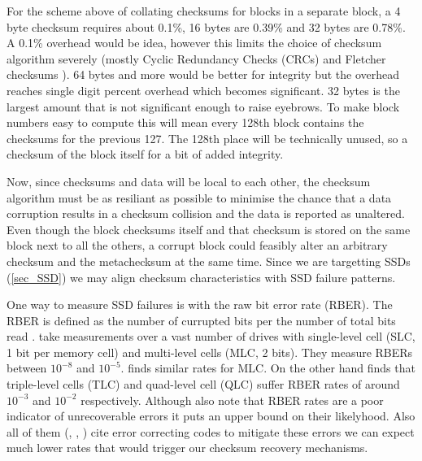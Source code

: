         For the scheme above of collating checksums for blocks in a separate
        block, a 4 byte checksum requires about 0.1\%, 16 bytes are 0.39\% and
        32 bytes are 0.78\%. A 0.1\% overhead would be idea, however this
        limits the choice of checksum algorithm severely (mostly Cyclic
        Redundancy Checks (CRCs) and Fletcher checksums
        \cite{embedded_checksums}). 64 bytes and more would be better for
        integrity but the overhead reaches single digit percent overhead which
        becomes significant. 32 bytes is the largest amount that is not
        significant enough to raise eyebrows. To make block numbers easy to
        compute this will mean every 128th block contains the checksums for the
        previous 127. The 128th place will be technically unused, so a checksum
        of the block itself for a bit of added integrity.

        Now, since checksums and data will be local to each other, the checksum
        algorithm must be as resiliant as possible to minimise the chance that
        a data corruption results in a checksum collision and the data is
        reported as unaltered. Even though the block checksums itself and that
        checksum is stored on the same block next to all the others, a corrupt
        block could feasibly alter an arbitrary checksum and the metachecksum
        at the same time. Since we are targetting SSDs (\ref{sec_SSD}) we may
        align checksum characteristics with SSD failure patterns.

        One way to measure SSD failures is with the raw bit error rate (RBER).
        The RBER is defined as the number of currupted bits per the number of
        total bits read \cite{flash_reliability}.
        \citeauthor{flash_reliability} take measurements over a vast number of
        drives with single-level cell (SLC, 1 bit per memory cell) and
        multi-level cells (MLC, 2 bits). They measure RBERs between $10^{-8}$
        and $10^{-5}$. \citeauthor{bit_error_mlc} finds similar rates for MLC.
        On the other hand \citeauthor{bit_error_qlc} finds that triple-level
        cells (TLC) and quad-level cell (QLC) suffer RBER rates of around
        $10^{-3}$ and $10^{-2}$ respectively. Although
        \citeauthor{flash_reliability} also note that RBER rates are a poor
        indicator of unrecoverable errors it puts an upper bound on their
        likelyhood. Also all of them (\cite{flash_reliability},
        \cite{bit_error_mlc}, \cite{bit_error_qlc}) cite error correcting codes
        to mitigate these errors we can expect much lower rates that would
        trigger our checksum recovery mechanisms.

